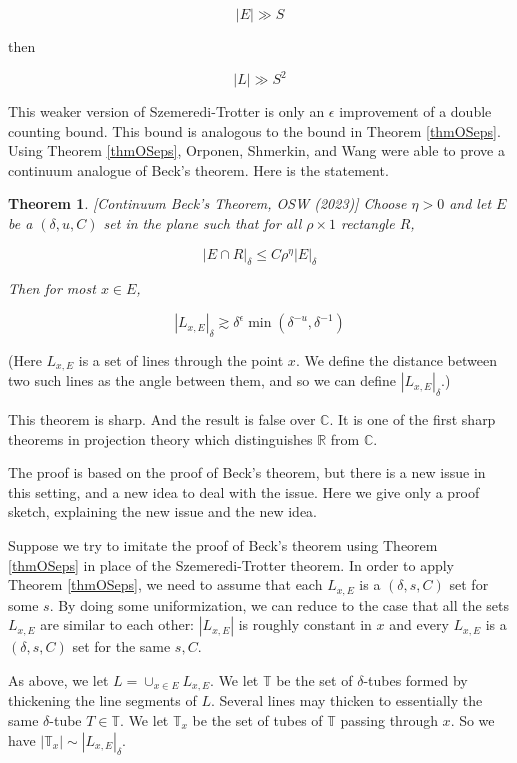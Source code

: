 \documentclass[12pt]{amsart}
\newtheorem{theorem}{Theorem}[section]
\newcommand{\CC}{\mathbb{C}}
\newcommand{\RR}{\mathbb{R}}
\newcommand{\TT}{\mathbb{T}}
\begin{document}
$$ |E| \gg S$$ 

then 

$$ |L| \gg S^2 $$ 

This weaker version of Szemeredi-Trotter is only an $\epsilon$ improvement of a double counting bound.   This bound is analogous to the bound in Theorem \ref{thmOSeps}.   Using Theorem \ref{thmOSeps},  Orponen, Shmerkin, and Wang were able to prove a continuum analogue of Beck's theorem.   Here is the statement.

\begin{theorem} \label{thmcontbeck} [Continuum Beck's Theorem, OSW (2023)]
    Choose $\eta > 0$ and let $E$ be a $(\delta, u, C)$ set in the plane such that for all  $\rho \times 1$ rectangle $R$, 

    $$ |E\cap R |_\delta \leq C \rho^\eta |E|_\delta$$ 

    Then for most $x\in E$, 

    $$ |L_{x,E}|_\delta \gtrsim \delta^\epsilon \min(\delta^{-u}, \delta^{-1})$$ 
\end{theorem}

(Here $L_{x,E}$ is a set of lines through the point $x$.   We define the distance between two such lines as the angle between them,  and so we can define $|L_{x,E}|_\delta$.)

This theorem is sharp.   And the result is false over $\mathbb{C}$.   It is one of the first sharp theorems in projection theory which distinguishes $\RR$ from $\CC$.  

The proof is based on the proof of Beck's theorem,  but there is a new issue in this setting,  and a new idea to deal with the issue.  Here we give only a proof sketch,  explaining the new issue and the new idea.  

Suppose we try to imitate the proof of Beck's theorem using Theorem \ref{thmOSeps} in place of the Szemeredi-Trotter theorem.   In order to apply Theorem \ref{thmOSeps},  we need to assume that each $L_{x,E}$ is a $(\delta, s, C)$ set for some $s$.   By doing some uniformization,  we can reduce to the case that all the sets $L_{x,E}$ are similar to each other: $|L_{x,E}|$ is roughly constant in $x$ and every $L_{x,E}$ is a $(\delta, s, C)$ set for the same $s, C$.  

As above,  we let $L = \cup_{x \in E} L_{x,E}$.   We let $\TT$ be the set of $\delta$-tubes formed by thickening the line segments of $L$.   Several lines may thicken to essentially the same $\delta$-tube $T \in \TT$.    We let $\TT_x$ be the set of tubes of $\TT$ passing through $x$.   So we have $| \TT_x | \sim | L_{x,E} |_\delta$.   
\end{document}
